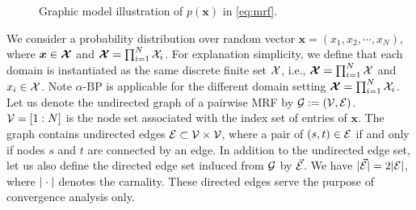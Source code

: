 \begin{figure}
  \begin{centering}
    \vskip -0.1in
    \caption{Graphic model illustration of $p(\bm{x})$ in \eqref{eq:mrf}.}\label{fig:factor-graph}
  \end{centering}
\end{figure}


We consider a probability distribution over random vector $\bm{x} = \left(  x_1, x_2, \cdots,  x_N  \right)$, where $\bm{x} \in \bm{\mathcal{X}}$ and $\bm{\mathcal{X}}=\prod_{i=1}^N\mathcal{X}_i$. For explanation simplicity, we define that each domain is instantiated as the same discrete finite set $\mathcal{X}$, i.e., $\bm{\mathcal{X}}=\prod_{i=1}^N\mathcal{X}$ and $x_i \in \mathcal{X}$. Note $\alpha$-BP is applicable for the different domain setting $\bm{\mathcal{X}}=\prod_{i=1}^N\mathcal{X}_i$. Let us denote the undirected graph of a pairwise MRF by $\mathcal{G}:=(\mathcal{V}, \mathcal{E})$. $\mathcal{V}=\left[ 1 : N \right]$ is the node set associated with the index set of entries of $\bm{x}$. The graph contains undirected edges $\mathcal{E} \subset \mathcal{V} \times \mathcal{V}$, where a pair of $(s, t) \in \mathcal{E}$ if and only if nodes $s$ and $t$ are connected by an edge. In addition to the undirected edge set, let us also define the directed edge set induced from $\mathcal{G}$ by $\vec{\mathcal{E}}$. We have $| \vec{\mathcal{E}} | = 2| \mathcal{E} |$, where $| \cdot |$ denotes the carnality. These directed edges serve the purpose of convergence analysis only.



